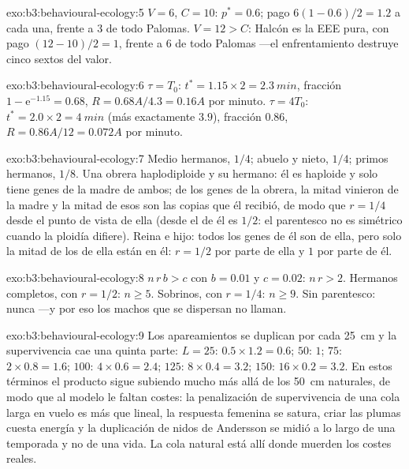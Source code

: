 \begin{solution}{exo:b3:behavioural-ecology:5}
$V = 6$, $C = 10$: $p^{*} = 0.6$; pago $6(1 - 0.6)/2 = 1.2$ a cada una,
frente a $3$ de todo Palomas. $V = 12 > C$: Halcón es la EEE pura, con
pago $(12 - 10)/2 = 1$, frente a $6$ de todo Palomas ---el
enfrentamiento destruye cinco sextos del valor.
\end{solution}

\begin{solution}{exo:b3:behavioural-ecology:6}
$\tau = T_{0}$: $t^{*} = 1.15\times 2 = \qty{2.3}{min}$, fracción $1 -
\mathrm{e}^{-1.15} = 0.68$, $R = 0.68A/4.3 = 0.16A$ por minuto. $\tau =
4T_{0}$: $t^{*} = 2.0\times 2 = \qty{4}{min}$ (más exactamente $3.9$),
fracción $0.86$, $R = 0.86A/12 = 0.072A$ por minuto.
\end{solution}

\begin{solution}{exo:b3:behavioural-ecology:7}
Medio hermanos, $1/4$; abuelo y nieto, $1/4$; primos hermanos, $1/8$.
Una obrera haplodiploide y su hermano: él es haploide y solo tiene
genes de la madre de ambos; de los genes de la obrera, la mitad vinieron
de la madre y la mitad de esos son las copias que él recibió, de modo
que $r = 1/4$ desde el punto de vista de ella (desde el de él es $1/2$:
el parentesco no es simétrico cuando la ploidía difiere). Reina e hijo:
todos los genes de él son de ella, pero solo la mitad de los de ella
están en él: $r = 1/2$ por parte de ella y $1$ por parte de él.
\end{solution}

\begin{solution}{exo:b3:behavioural-ecology:8}
$n\,r\,b > c$ con $b = 0.01$ y $c = 0.02$: $n\,r > 2$. Hermanos
completos, con $r
= 1/2$: $n \ge 5$. Sobrinos, con $r = 1/4$: $n \ge 9$. Sin parentesco:
nunca ---y por eso los machos que se dispersan no llaman.
\end{solution}

\begin{solution}{exo:b3:behavioural-ecology:9}
Los apareamientos se duplican por cada \qty{25}{cm} y la supervivencia
cae una quinta parte: $L = 25$: $0.5\times 1.2 = 0.6$; $50$: $1$; $75$:
$2\times 0.8 = 1.6$; $100$: $4\times 0.6 = 2.4$; $125$:
$8\times 0.4 = 3.2$; $150$: $16\times 0.2 =
3.2$. En estos términos el producto sigue subiendo mucho más allá de
los \qty{50}{cm} naturales, de modo que al modelo le faltan costes: la
penalización de supervivencia de una cola larga en vuelo es más que
lineal, la respuesta femenina se satura, criar las plumas cuesta
energía y la duplicación de nidos de Andersson se midió a lo largo de
una temporada y no de una vida. La cola natural está allí donde muerden
los costes reales.
\end{solution}

